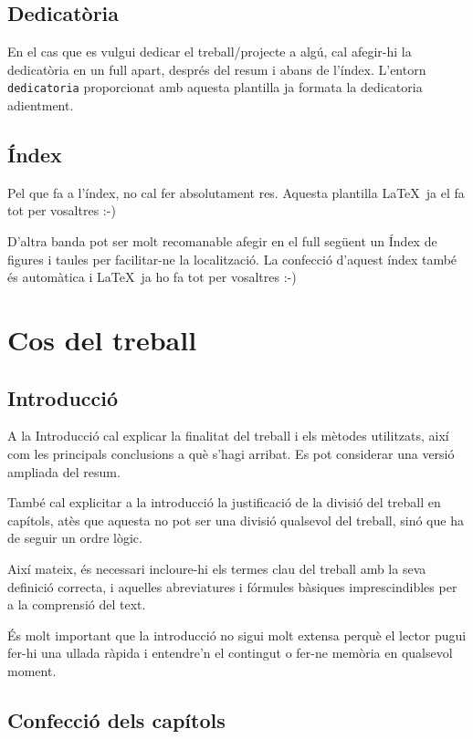 \subsection{Dedicatòria}

En el cas que es vulgui dedicar el treball/projecte a algú, cal afegir-hi la dedicatòria en un full apart, després del resum i abans de l'índex. L'entorn \texttt{dedicatoria} proporcionat amb aquesta plantilla ja formata la dedicatoria adientment. 


\subsection{Índex}

Pel que fa a l'índex, no cal fer absolutament res. Aquesta plantilla \LaTeX \ ja el fa tot per vosaltres :-)

D'altra banda pot ser molt recomanable afegir en el full següent un Índex de figures i taules per facilitar-ne la localització. La confecció d'aquest índex també és automàtica i  \LaTeX \ ja ho fa tot per vosaltres :-)

  
\section{Cos del treball}

\subsection{Introducció}

A la Introducció cal explicar la finalitat del treball i els mètodes utilitzats, així com les principals conclusions a què s'hagi arribat. Es pot considerar una versió ampliada del resum.

També cal explicitar a la introducció la justificació de la divisió del treball en capítols, atès que aquesta no pot ser una divisió qualsevol del treball, sinó que ha de seguir un ordre lògic.

Així mateix, és necessari incloure-hi els termes clau del treball amb la seva definició correcta, i aquelles abreviatures i fórmules bàsiques imprescindibles per a la comprensió del text.

És molt important que la introducció no sigui molt extensa perquè el lector pugui fer-hi una ullada ràpida i entendre'n el contingut o fer-ne memòria en qualsevol moment.


\subsection{Confecció dels capítols}

